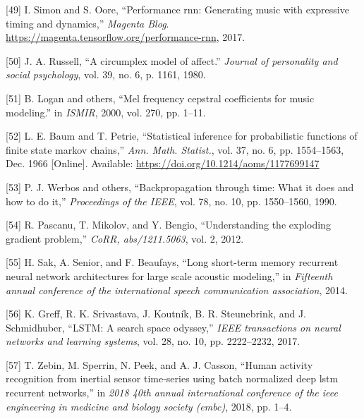 \documentclass[12pt,]{article}
\begin{document}
\leavevmode\hypertarget{ref-performance-rnn-2017}{}%
{[}49{]} I. Simon and S. Oore, ``Performance rnn: Generating music with
expressive timing and dynamics,'' \emph{Magenta Blog}.
\url{https://magenta.tensorflow.org/performance-rnn}, 2017.

\leavevmode\hypertarget{ref-russell1980circumplex}{}%
{[}50{]} J. A. Russell, ``A circumplex model of affect.'' \emph{Journal
of personality and social psychology}, vol. 39, no. 6, p. 1161, 1980.

\leavevmode\hypertarget{ref-logan2000mel}{}%
{[}51{]} B. Logan and others, ``Mel frequency cepstral coefficients for
music modeling.'' in \emph{ISMIR}, 2000, vol. 270, pp. 1--11.

\leavevmode\hypertarget{ref-baum1966}{}%
{[}52{]} L. E. Baum and T. Petrie, ``Statistical inference for
probabilistic functions of finite state markov chains,'' \emph{Ann.
Math. Statist.}, vol. 37, no. 6, pp. 1554--1563, Dec. 1966 {[}Online{]}.
Available: \url{https://doi.org/10.1214/aoms/1177699147}

\leavevmode\hypertarget{ref-werbos1990backpropagation}{}%
{[}53{]} P. J. Werbos and others, ``Backpropagation through time: What
it does and how to do it,'' \emph{Proceedings of the IEEE}, vol. 78, no.
10, pp. 1550--1560, 1990.

\leavevmode\hypertarget{ref-pascanu2012understanding}{}%
{[}54{]} R. Pascanu, T. Mikolov, and Y. Bengio, ``Understanding the
exploding gradient problem,'' \emph{CoRR, abs/1211.5063}, vol. 2, 2012.

\leavevmode\hypertarget{ref-sak2014long}{}%
{[}55{]} H. Sak, A. Senior, and F. Beaufays, ``Long short-term memory
recurrent neural network architectures for large scale acoustic
modeling,'' in \emph{Fifteenth annual conference of the international
speech communication association}, 2014.

\leavevmode\hypertarget{ref-greff2017lstm}{}%
{[}56{]} K. Greff, R. K. Srivastava, J. Koutník, B. R. Steunebrink, and
J. Schmidhuber, ``LSTM: A search space odyssey,'' \emph{IEEE
transactions on neural networks and learning systems}, vol. 28, no. 10,
pp. 2222--2232, 2017.

\leavevmode\hypertarget{ref-zebin2018human}{}%
{[}57{]} T. Zebin, M. Sperrin, N. Peek, and A. J. Casson, ``Human
activity recognition from inertial sensor time-series using batch
normalized deep lstm recurrent networks,'' in \emph{2018 40th annual
international conference of the ieee engineering in medicine and biology
society (embc)}, 2018, pp. 1--4.
\end{document}
